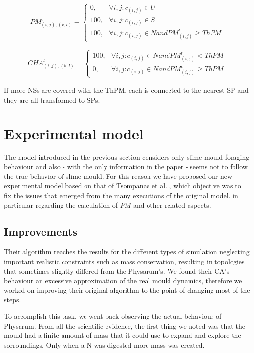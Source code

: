 \begin{equation}
PM^t_{(i, j),(k,l)}=
\begin{cases} 
0, & \forall i, j: c_{(i,j)} \in U \\ 
100, & \forall i, j: c_{(i,j)} \in S \\ 
100, & \forall i, j: c_{(i,j)} \in N and  PM^t_{(i, j)} \geq ThPM 
\end{cases}
\end{equation}

\begin{align}
CHA^t_{(i, j),(k,l)}=
\begin{cases} 
100, & \forall i, j: c_{(i,j)} \in N and PM^t_{(i, j)} < ThPM\\ 
0, & \forall i, j: c_{(i,j)} \in N and  PM^t_{(i, j)} \geq ThPM 
\end{cases}
\end{align}

If more NSs are covered with the ThPM, each is connected to the nearest SP and they are all transformed to SPs. 

\section{Experimental model}

The model introduced in the previous section considers only slime mould foraging behaviour and also - with the only information in the paper - seems not to follow the true behavior of slime mould. For this reason we have proposed our new experimental model based on that of Tsompanas et al. \cite{Tsompanas2016}, which objective was to fix the issues that emerged from the many executions of the original model, in particular regarding the calculation of $PM$ and other related aspects.

\subsection{Improvements}
Their algorithm reaches the results for the different types of simulation neglecting important realistic constraints such as mass conservation, resulting in topologies that sometimes slightly differed from the Physarum's. We found their CA's behaviour an excessive approximation of the real mould dynamics, therefore we worked on improving their original algorithm to the point of changing most of the steps.

\par
To accomplish this task, we went back observing the actual behaviour of Physarum. From all the scientific evidence, the first thing we noted was that the mould had a finite amount of mass that it could use to expand and explore the sorroundings. Only when a N was digested more mass was created. 

